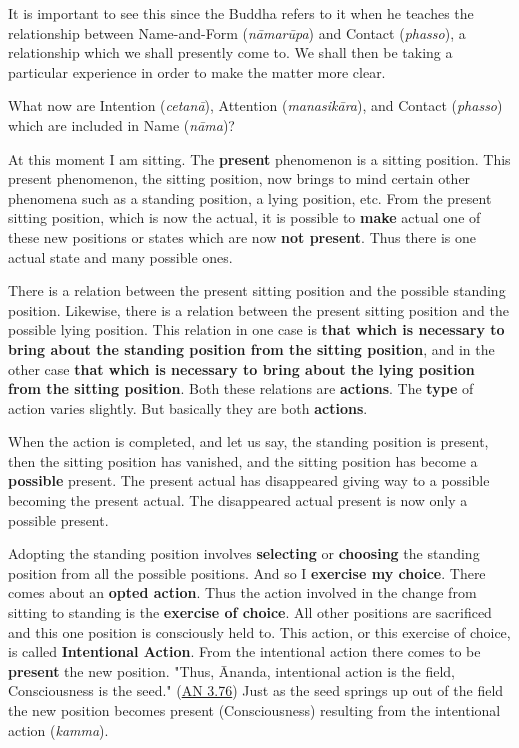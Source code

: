 It is important to see this since the Buddha refers to it when he teaches the relationship between Name-and-Form (\emph{nāmarūpa}) and Contact (\emph{phasso}), a relationship which we shall presently come to. We shall then be taking a particular experience in order to make the matter more clear.

What now are Intention (\emph{cetanā}), Attention (\emph{manasikāra}), and Contact (\emph{phasso}) which are included in Name (\emph{nāma})?

At this moment I am sitting. The \textbf{present} phenomenon is a sitting position. This present phenomenon, the sitting position, now brings to mind certain other phenomena such as a standing position, a lying position, etc. From the present sitting position, which is now the actual, it is possible to \textbf{make} actual one of these new positions or states which are now \textbf{not present}. Thus there is one actual state and many possible ones.

There is a relation between the present sitting position and the possible standing position. Likewise, there is a relation between the present sitting position and the possible lying position. This relation in one case is \textbf{that which is necessary to bring about the standing position from the sitting position}, and in the other case \textbf{that which is necessary to bring about the lying position from the sitting position}. Both these relations are \textbf{actions}. The \textbf{type} of action varies slightly. But basically they are both \textbf{actions}.

When the action is completed, and let us say, the standing position is present, then the sitting position has vanished, and the sitting position has become a \textbf{possible} present. The present actual has disappeared giving way to a possible becoming the present actual. The disappeared actual present is now only a possible present.

Adopting the standing position involves \textbf{selecting} or \textbf{choosing} the standing position from all the possible positions. And so I \textbf{exercise my choice}. There comes about an \textbf{opted action}. Thus the action involved in the change from sitting to standing is the \textbf{exercise of choice}. All other positions are sacrificed and this one position is consciously held to. This action, or this exercise of choice, is called \textbf{Intentional Action}. From the intentional action there comes to be \textbf{present} the new position. "Thus, Ānanda, intentional action is the field, Consciousness is the seed." (\href{https://suttacentral.net/an3.76/en/thanissaro}{AN 3.76}) Just as the seed springs up out of the field the new position becomes present (Consciousness) resulting from the intentional action (\emph{kamma}).

